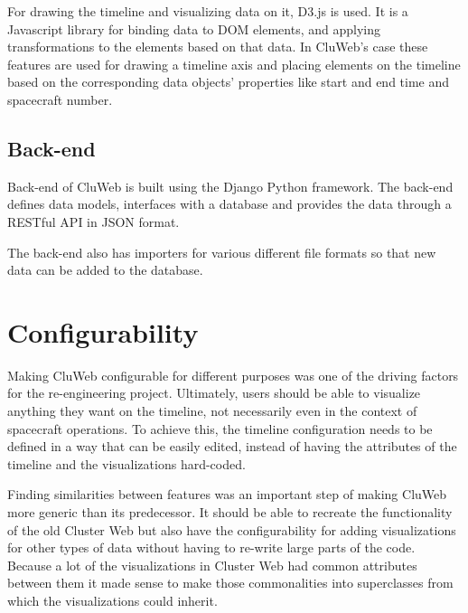 For drawing the timeline and visualizing data on it, D3.js is used. It is a Javascript library for binding data to DOM elements, and applying transformations to the elements based on that data. In CluWeb's case these features are used for drawing a timeline axis and placing elements on the timeline based on the corresponding data objects' properties like start and end time and spacecraft number.

\subsection{Back-end}
Back-end of CluWeb is built using the Django Python framework. The back-end defines data models, interfaces with a database and provides the data through a RESTful API in JSON format.

The back-end also has importers for various different file formats so that new data can be added to the database. 

\section{Configurability}
Making CluWeb configurable for different purposes was one of the driving factors for the re-engineering project. Ultimately, users should be able to visualize anything they want on the timeline, not necessarily even in the context of spacecraft operations. To achieve this, the timeline configuration needs to be defined in a way that can be easily edited, instead of having the attributes of the timeline and the visualizations hard-coded.

Finding similarities between features was an important step of making CluWeb more generic than its predecessor. It should be able to recreate the functionality of the old Cluster Web but also have the configurability for adding visualizations for other types of data without having to re-write large parts of the code. Because a lot of the visualizations in Cluster Web had common attributes between them it made sense to make those commonalities into superclasses from which the visualizations could inherit.

